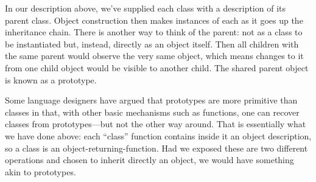 
In our description above, we’ve supplied each class with a description of its
parent class. Object construction then makes instances of each as it goes up the
inheritance chain. There is another way to think of the parent: not as a class
to be instantiated but, instead, directly as an object itself. Then all children
with the same parent would observe the very same object, which means changes to
it from one child object would be visible to another child. The shared parent
object is known as a prototype.

Some language designers have argued that prototypes are more primitive than
classes in that, with other basic mechanisms such as functions, one can recover
classes from prototypes—but not the other way around. That is essentially what
we have done above: each “class” function contains inside it an object
description, so a class is an object-returning-function. Had we exposed these
are two different operations and chosen to inherit directly an object, we would
have something akin to prototypes.

